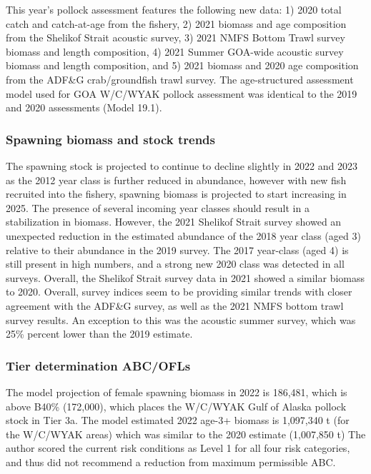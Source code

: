 \documentclass[]{tufte-handout}
\begin{document}
This year's pollock assessment features the following new data: 1) 2020
total catch and catch-at-age from the fishery, 2) 2021 biomass and age
composition from the Shelikof Strait acoustic survey, 3) 2021 NMFS
Bottom Trawl survey biomass and length composition, 4) 2021 Summer
GOA-wide acoustic survey biomass and length composition, and 5) 2021
biomass and 2020 age composition from the ADF\&G crab/groundfish trawl
survey. The age-structured assessment model used for GOA W/C/WYAK
pollock assessment was identical to the 2019 and 2020 assessments (Model
19.1).

\hypertarget{spawning-biomass-and-stock-trends}{%
\subsubsection{Spawning biomass and stock
trends}\label{spawning-biomass-and-stock-trends}}

The spawning stock is projected to continue to decline slightly in 2022
and 2023 as the 2012 year class is further reduced in abundance, however
with new fish recruited into the fishery, spawning biomass is projected
to start increasing in 2025. The presence of several incoming year
classes should result in a stabilization in biomass. However, the 2021
Shelikof Strait survey showed an unexpected reduction in the estimated
abundance of the 2018 year class (aged 3) relative to their abundance in
the 2019 survey. The 2017 year-class (aged 4) is still present in high
numbers, and a strong new 2020 class was detected in all surveys.
Overall, the Shelikof Strait survey data in 2021 showed a similar
biomass to 2020. Overall, survey indices seem to be providing similar
trends with closer agreement with the ADF\&G survey, as well as the 2021
NMFS bottom trawl survey results. An exception to this was the acoustic
summer survey, which was 25\% percent lower than the 2019 estimate.

\hypertarget{tier-determination-abcofls}{%
\subsubsection{Tier determination
ABC/OFLs}\label{tier-determination-abcofls}}

The model projection of female spawning biomass in 2022 is 186,481,
which is above B40\% (172,000), which places the W/C/WYAK Gulf of Alaska
pollock stock in Tier 3a. The model estimated 2022 age-3+ biomass is
1,097,340 t (for the W/C/WYAK areas) which was similar to the 2020
estimate (1,007,850 t) The author scored the current risk conditions as
Level 1 for all four risk categories, and thus did not recommend a
reduction from maximum permissible ABC.
\end{document}
